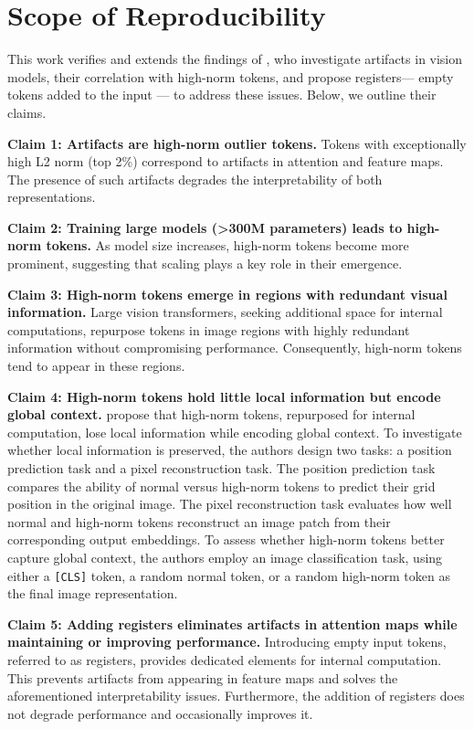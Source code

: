 \documentclass[10pt]{article} %
\begin{document}
\section{Scope of Reproducibility}
\label{sec:scope}
This work verifies and extends the findings of \citet{darcet2024registers}, who investigate artifacts in vision models, their correlation with high-norm tokens, and propose registers— empty tokens added to the input — to address these issues. Below, we outline their claims.

\textbf{Claim 1: Artifacts are high-norm outlier tokens.}  
Tokens with exceptionally high L2 norm (top 2\%) correspond to artifacts in attention and feature maps. The presence of such artifacts degrades the interpretability of both representations.

\textbf{Claim 2: Training large models (>300M parameters) leads to high-norm tokens.}  
As model size increases, high-norm tokens become more prominent, suggesting that scaling plays a key role in their emergence.

\textbf{Claim 3: High-norm tokens emerge in regions with redundant visual information.}
Large vision transformers, seeking additional space for internal computations, repurpose tokens in image regions with highly redundant information without compromising performance. Consequently, high-norm tokens tend to appear in these regions.

\textbf{Claim 4: High-norm tokens hold little local information but encode global context.}  
\citet{darcet2024registers} propose that high-norm tokens, repurposed for internal computation, lose local information while encoding global context. To investigate whether local information is preserved, the authors design two tasks: a position prediction task and a pixel reconstruction task. The position prediction task compares the ability of normal versus high-norm tokens to predict their grid position in the original image. The pixel reconstruction task evaluates how well normal and high-norm tokens reconstruct an image patch from their corresponding output embeddings. To assess whether high-norm tokens better capture global context, the authors employ an image classification task, using either a \texttt{[CLS]} token, a random normal token, or a random high-norm token as the final image representation.

\textbf{Claim 5: Adding registers eliminates artifacts in attention maps while maintaining or improving performance.}  
Introducing empty input tokens, referred to as registers, provides dedicated elements for internal computation. This prevents artifacts from appearing in feature maps and solves the aforementioned interpretability issues. Furthermore, the addition of registers does not degrade performance and occasionally improves it.
\end{document}
